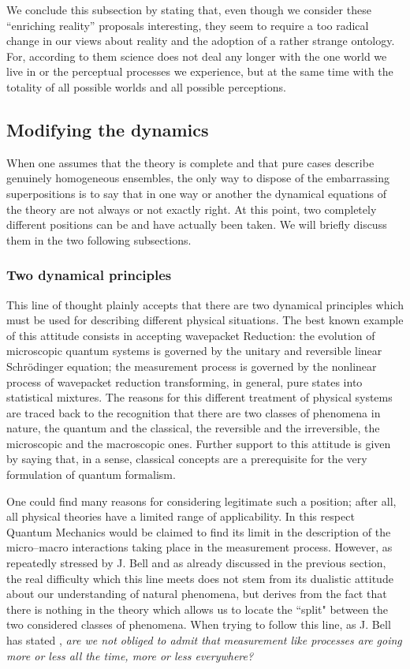 \documentclass[12pt]{article}
\begin{document}
We conclude this subsection by stating that, even though we
consider these ``enriching reality'' proposals interesting, they
seem to require a too radical change in our views about reality
and the adoption of a rather strange ontology. For, according to
them science does not deal any longer with the one world we live
in or the perceptual processes we experience, but at the same time
with the totality of all possible worlds and all possible
perceptions.


\subsection{Modifying the dynamics} \label{sec37}

When one assumes that the theory is complete and that pure cases
describe genuinely homogeneous ensembles, the only way to dispose
of the embarrassing superpositions is to say that in one way or
another the dynamical equations of the theory are not always or
not exactly right. At this point, two completely different
positions can be and have actually been taken. We will briefly
discuss them in the two following subsections.


\subsubsection{Two dynamical principles} \label{sec371}

This line of thought plainly accepts that there are two dynamical
principles which must be used for describing different physical
situations. The best known example of this attitude consists in
accepting wavepacket Reduction: the evolution of microscopic
quantum systems is governed by the unitary and reversible linear
Schr\"odinger equation; the measurement process is governed by the
nonlinear process of wavepacket reduction transforming, in
general, pure states into statistical mixtures. The reasons for
this different treatment of physical systems are traced back to
the recognition that there are two classes of phenomena in nature,
the quantum and the classical, the reversible and the
irreversible, the microscopic and the macroscopic ones. Further
support to this attitude is given by saying that, in a sense,
classical concepts are a prerequisite for the very formulation of
quantum formalism.

One could find many reasons for considering legitimate such a
position; after all, all physical theories have a limited range of
applicability. In this respect Quantum Mechanics would be claimed
to find its limit in the description of the micro--macro
interactions taking place in the measurement process. However, as
repeatedly stressed by J. Bell and as already discussed in the
previous section, the real difficulty which this line meets does
not stem from its dualistic attitude about our understanding of
natural phenomena, but derives from the fact that there is nothing
in the theory which allows us to locate the ``split" between the
two considered classes of phenomena. When trying to follow this
line, as J. Bell has stated \cite{bellam}, {\it are we not obliged
to admit that measurement like processes are going more or less
all the time, more or less everywhere?}
\end{document}
